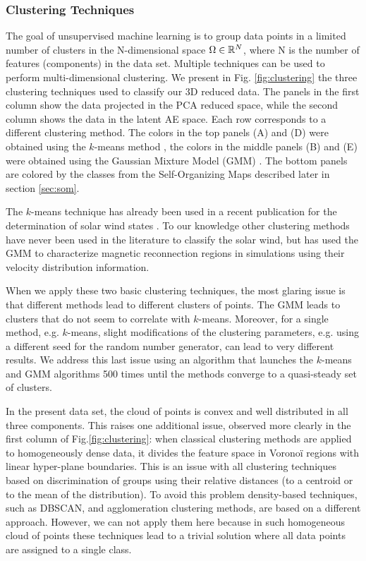 \subsubsection{Clustering Techniques}
\label{sec:clustering}
The goal of unsupervised machine learning is to group data points in a limited number of clusters in the N-dimensional space $\Omega\in\Bbb R^N$, where N is the number of features (components) in the data set. Multiple techniques can be used to perform multi-dimensional clustering. We present in Fig. \ref{fig:clustering} the three clustering techniques used to classify our 3D reduced data. The panels in the first column show the data projected in the PCA reduced space, while the second column shows the data in the latent AE space. Each row corresponds to a different clustering method. The colors in the top panels (A) and (D) were obtained using the $k$-means method \citep{1056489}, the colors in the middle panels (B) and (E) were obtained using the Gaussian Mixture Model (GMM) \citep{bishop2006machine}. The bottom panels are colored by the classes from the Self-Organizing Maps described later in section \ref{sec:som}.

The $k$-means technique has already been used in a recent publication for the determination of solar wind states \citep{Roberts2020}. To our knowledge other clustering methods have never been used in the literature to classify the solar wind, but \citep{Dupuis2020} has used the GMM to characterize magnetic reconnection regions in simulations using their velocity distribution information.

When we apply these two basic clustering techniques, the most glaring issue is that different methods lead to different clusters of points. The GMM leads to clusters that do not seem to correlate with $k$-means. Moreover, for a single method, e.g. $k$-means, slight modifications of the clustering parameters, e.g. using a different seed for the random number generator, can lead to very different results. We address this last issue using an algorithm that launches the $k$-means and GMM algorithms 500 times until the methods converge to a quasi-steady set of clusters.

In the present data set, the cloud of points is convex and well distributed in all three components. This raises one additional issue, observed more clearly in the first column of Fig.\ref{fig:clustering}: when classical clustering methods are applied to homogeneously dense data, it divides the feature space in Vorono\"i regions with linear hyper-plane boundaries. This is an issue with all clustering techniques based on discrimination of groups using their relative distances (to a centroid or to the mean of the distribution). To avoid this problem density-based techniques, such as DBSCAN\citep{ester1996density}, and agglomeration clustering methods, are based on a different approach. However, we can not apply them here because in such homogeneous cloud of points these techniques lead to a trivial solution where all data points are assigned to a single class.

